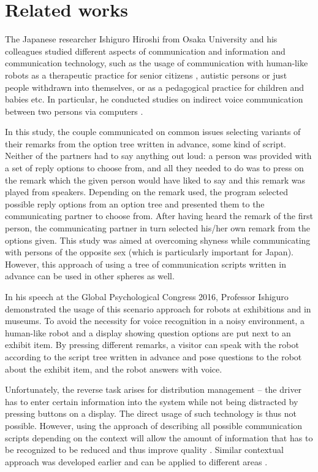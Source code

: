 \documentclass[review,authoryear]{elsarticle}
\begin{document}
\section{Related works} \label{sec:lit}

The Japanese researcher Ishiguro Hiroshi from Osaka University and his colleagues studied different aspects of communication and information and communication technology, such as the usage of communication with human-like robots as a therapeutic practice for senior citizens \citep{Nishio_2015}, autistic persons \citep{Kumazaki_2016} or just people withdrawn into themselves, or as a pedagogical practice for children and babies \citep{Park_2015} etc. In particular, he conducted studies on indirect voice communication between two persons via computers \citep{Ishiguro_2016}.

In this study, the couple communicated on common issues selecting variants of their remarks from the option tree written in advance, some kind of script. Neither of the partners had to say anything out loud: a person was provided with a set of reply options to choose from, and all they needed to do was to press on the remark which the given person would have liked to say and this remark was played from speakers. Depending on the remark used, the program selected possible reply options from an option tree and presented them to the communicating partner to choose from. After having heard the remark of the first person, the communicating partner in turn selected his/her own remark from the options given. This study was aimed at overcoming shyness while communicating with persons of the opposite sex (which is particularly important for Japan). However, this approach of using a tree of communication scripts written in advance can be used in other spheres as well. 

In his speech at the Global Psychological Congress 2016, Professor Ishiguro demonstrated the usage of this scenario approach for robots at exhibitions and in museums.  To avoid the necessity for voice recognition in a noisy environment, a human-like robot and a display showing question options are put next to an exhibit item. By pressing different remarks, a visitor can speak with the robot according to the script tree written in advance and pose questions to the robot about the exhibit item, and the robot answers with voice. 

Unfortunately, the reverse task arises for distribution management – the driver has to enter certain information into the system while not being distracted by pressing buttons on a display. The direct usage of such technology is thus not possible. However, using the approach of describing all possible communication scripts depending on the context will allow the amount of information that has to be recognized to be reduced and thus improve quality \citep{eng_art2}. Similar contextual approach was developed earlier and can be applied to different areas \citep{Herbert_2018}.
\end{document}
